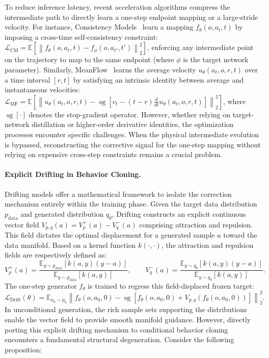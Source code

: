 To reduce inference latency, recent acceleration algorithms compress the intermediate path to directly learn a one-step endpoint mapping or a large-stride velocity. 
For instance, Consistency Models~\cite{prasad2024consistencypolicyacceleratedvisuomotor} learn a mapping \(f_\theta(o, a_t, t)\) by imposing a cross-time self-consistency constraint:
\(\mathcal{L}_{\text{CM}} = \mathbb{E}\left[ \left\| f_\theta(o, a_t, t) - f_{\phi}(o, a_{t'}, t') \right\|_2^2 \right]\),
enforcing any intermediate point on the trajectory to map to the same endpoint (where \(\phi\) is the target network parameter). 
Similarly, MeanFlow~\cite{geng2025meanflowsonestepgenerative} learns the average velocity \(u_\theta(a_t, o, r, t)\) over a time interval \([r, t]\) by satisfying an intrinsic identity between average and instantaneous velocities:
\(\mathcal{L}_{\text{MF}} = \mathbb{E}\left[ \left\| u_\theta(a_t, o, r, t) - \operatorname{sg}\left[ v_t - (t-r)\frac{d}{dt}u_\theta(a_t, o, r, t) \right] \right\|_2^2 \right]\),
where \(\operatorname{sg}[\cdot]\) denotes the stop-gradient operator.
However, whether relying on target-network distillation or higher-order derivative identities, the optimization processes encounter specific challenges. 
When the physical intermediate evolution is bypassed, 
reconstructing the corrective signal for the one-step mapping without relying on expensive cross-step constraints remains a crucial problem.

\paragraph{Explicit Drifting in Behavior Cloning.}
Drifting models offer a mathematical framework to isolate the correction mechanism entirely within the training phase. 
Given the target data distribution \(p_{\text{data}}\) and generated distribution \(q_\theta\), 
Drifting constructs an explicit continuous vector field \(V_{p,q}(a) = V_p^+(a) - V_q^-(a)\) comprising attraction and repulsion. 
This field dictates the optimal displacement for a generated sample \(a\) toward the data manifold. Based on a kernel function \(k(\cdot, \cdot)\), 
the attraction and repulsion fields are respectively defined as:
\begin{equation}
    V_p^+(a) = \frac{\mathbb{E}_{y\sim p_{\text{data}}}[k(a, y)(y - a)]}{\mathbb{E}_{y\sim p_{\text{data}}}[k(a, y)]}, \qquad V_q^-(a) = \frac{\mathbb{E}_{y\sim q_\theta}[k(a, y)(y - a)]}{\mathbb{E}_{y\sim q_\theta}[k(a, y)]}.
\end{equation}
The one-step generator \(f_\theta\) is trained to regress this field-displaced frozen target:
\begin{equation}
    \mathcal{L}_{\mathrm{Drift}}(\theta) = \mathbb{E}_{a_0 \sim p_0} \left\| f_\theta(o, a_0, 0) - \operatorname{sg}\left[ f_\theta(o, a_0, 0) + V_{p,q}(f_\theta(o, a_0, 0)) \right] \right\|_2^2.
\end{equation}
In unconditional generation, the rich sample sets supporting the distributions enable the vector field to provide smooth manifold guidance.
However, directly porting this explicit drifting mechanism to conditional behavior cloning encounters a fundamental structural degeneration. 
Consider the following proposition:

